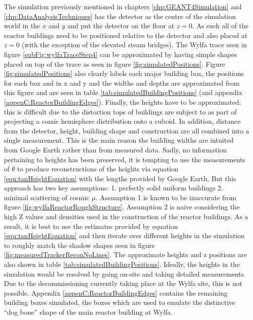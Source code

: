The simulation previously mentioned in chapters \ref{chp:GEANT4Simulation} and \ref{chp:DataAnalysisTechniques} has the detector as the centre of the simulation world in the $x$ and $y$ and put the detector on the floor at  $z = 0 $. As such all of the reactor buildings need to be positioned relative to the detector and also placed at $z = 0$ (with the exception of the elevated steam bridges). The Wylfa trace seen in figure \ref{subFig:wylfaTraceStep4} can be approximated by having simple shapes placed on top of the trace as seen in figure \ref{fig:simulatedPositions}. Figure \ref{fig:simulatedPositions} also clearly labels each major building box, the positions for each box and in x and y and the widths and depths are approximated from this figure and are seen in table \ref{tab:simulatedBuildingPositions} (and appendix \ref{appenC:ReactorBuildingEdges}). Finally, the heights have to be approximated: this is difficult due to the distortion tops of buildings are subject to as part of projecting a comic hemisphere distribution onto a cuboid. In addition, distance from the detector, height, building shape and construction are all combined into a single measurement. This is the main reason the building widths are intuited from Google Earth rather than from measured data. Sadly, no information pertaining to heights has been preserved, it is tempting to use the measurements of $\theta$ to produce reconstructions of the heights via equation \ref{equ:tanHeightEquation} with the lengths provided by Google Earth. But this approach has two key assumptions: 1. perfectly solid uniform buildings 2. minimal scattering of cosmic $\mu$. Assumption 1 is known to be inaccurate from figure \ref{fig:wylfaReactorRoughStructure}. Assumption 2 is naive considering the high Z values and densities used in the construction of the reactor buildings. As a result, it is best to use the estimates provided by equation \ref{equ:tanHeightEquation} and then iterate over different heights in the simulation to roughly match the shadow shapes seen in figure \ref{fig:measuredTrackerReconNoLines}. The approximate heights and z positions are also shown in table \ref{tab:simulatedBuildingPositions}. Ideally, the heights in the simulation would be resolved by going on-site and taking detailed measurements. Due to the decommissioning currently taking place at the Wylfa site, this is not possible. Appendix \ref{appenC:ReactorBuildingEdges} contains the remaining building boxes simulated, the boxes which are used to emulate the distinctive ``dog bone'' shape of the main reactor building at Wylfa.

